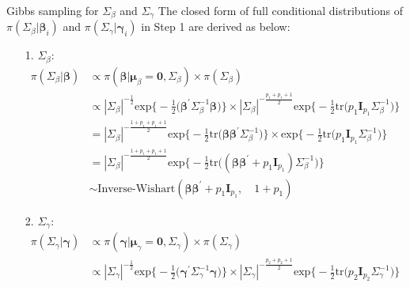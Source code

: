 \documentclass[a4paper, 12pt]{article}
\makeatletter
\renewcommand{\subsection}{\@startsection
	{subsection}    {2}    {0mm}    {-0.5\baselineskip}    {0.01\baselineskip}    {\normalfont\normalsize\itshape\center}}
\makeatother
\begin{document}
\subsection{Gibbs sampling for $\Sigma_{\beta}$ and $\Sigma_{\gamma}$}
\noindent The closed form of full conditional distributions of $\pi(\Sigma_{\beta}|\mathbf{\beta}_i)$ and $\pi(\Sigma_{\gamma}|\mathbf{\gamma}_i)$ in Step 1 are derived as below:
	\begin{itemize}
		\item [1.] $\Sigma_{\beta}$:
		\begin{equation*}
		\begin{aligned}
		\pi(\Sigma_{\beta}|\mathbf{\beta}) 	&\propto \pi(\mathbf{\beta}|\mathbf{\mu}_{\beta} = \mathbf{0}, \Sigma_{\beta}) \times \pi(\Sigma_{\beta}) \\
		&\propto |\Sigma_{\beta}|^{-\frac{1}{2}}\mbox{exp}\Big\{-\frac{1}{2}\Big(\mathbf{\beta}^\prime \Sigma_{\beta}^{-1}\mathbf{\beta}\Big)\Big\}\times |\Sigma_{\beta}|^{-\frac{p_1+ p_1 + 1}{2}}\mbox{exp}\Big\{-\frac{1}{2}\mbox{tr}\Big(p_1\mathbf{I}_{p_1}\Sigma_{\beta}^{-1}\Big)\Big\}\\
		& = |\Sigma_{\beta}|^{-\frac{1 + p_1 + p_1 +1}{2}}\mbox{exp}\Big\{-\frac{1}{2}\mbox{tr}\Big(\mathbf{\beta}\mathbf{\beta}^\prime \Sigma_{\beta}^{-1}\Big)\Big\}\times \mbox{exp}\Big\{-\frac{1}{2}\mbox{tr}\Big(p_1\mathbf{I}_{p_1}\Sigma_{\beta}^{-1}\Big)\Big\}\\
		& = |\Sigma_{\beta}|^{-\frac{1 + p_1 + p_1 +1}{2}}\mbox{exp}\Big\{-\frac{1}{2}\mbox{tr}\Big((\mathbf{\beta}\mathbf{\beta}^\prime + p_1\mathbf{I}_{p_1})\Sigma_{\beta}^{-1}\Big) \Big\}\\
		&\sim \mbox{Inverse-Wishart}(\mathbf{\beta}\mathbf{\beta}^\prime + p_1\mathbf{I}_{p_1},\quad 1 + p_1)	
		\end{aligned}
		\end{equation*} 
		\item [2.] $\Sigma_{\gamma}$:
		\begin{equation*}
		\begin{aligned}
		\pi(\Sigma_{\gamma}|\mathbf{\gamma}) 	&\propto \pi(\mathbf{\gamma}|\mathbf{\mu}_{\gamma} = \mathbf{0}, \Sigma_{\gamma}) \times \pi(\Sigma_{\gamma}) \\
		&\propto |\Sigma_{\gamma}|^{-\frac{1}{2}}\mbox{exp}\Big\{-\frac{1}{2}\Big(\mathbf{\gamma}^\prime \Sigma_{\gamma}^{-1}\mathbf{\gamma}\Big)\Big\}\times |\Sigma_{\gamma}|^{-\frac{p_2 + p_2 + 1}{2}}\mbox{exp}\Big\{-\frac{1}{2}\mbox{tr}\Big(p_2 \mathbf{I}_{p_2}\Sigma_{\gamma}^{-1}\Big)\Big\}\\

\end{aligned}
\end{equation*}
\end{itemize}
\end{document}
